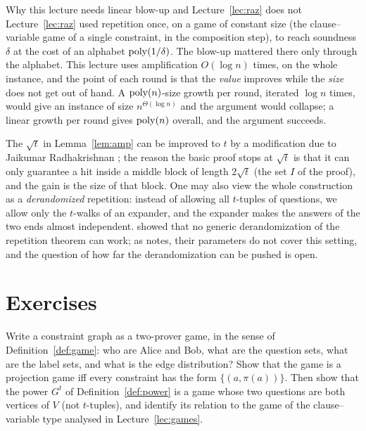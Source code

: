 \begin{bigpicture}{Why this lecture needs linear blow-up and Lecture~\ref{lec:raz} does not}
Lecture~\ref{lec:raz} used repetition once, on a game of constant size (the clause--variable game of a single constraint, in the composition step), to reach soundness $\delta$ at the cost of an alphabet $\operatorname{poly}(1/\delta)$.  The blow-up mattered there only through the alphabet.
This lecture uses amplification $O(\log n)$ times, on the whole instance, and the point of each round is that the \emph{value} improves while the \emph{size} does not get out of hand.
A $\operatorname{poly}(n)$-size growth per round, iterated $\log n$ times, would give an instance of size $n^{\Theta(\log n)}$ and the argument would collapse; a linear growth per round gives $\operatorname{poly}(n)$ overall, and the argument succeeds.
\end{bigpicture}

\begin{remark}
The $\sqrt t$ in Lemma~\ref{lem:amp} can be improved to $t$ by a modification due to Jaikumar Radhakrishnan \citep[footnote in Section~9]{Dinur07}; the reason the basic proof stops at $\sqrt t$ is that it can only guarantee a hit inside a middle block of length $2\sqrt t$ (the set $I$ of the proof), and the gain is the size of that block.
One may also view the whole construction as a \emph{derandomized} repetition: instead of allowing all $t$-tuples of questions, we allow only the $t$-walks of an expander, and the expander makes the answers of the two ends almost independent.
\citet{FeigeKilian95} showed that no generic derandomization of the repetition theorem can work; as \citet{Dinur07} notes, their parameters do not cover this setting, and the question of how far the derandomization can be pushed is open.
\end{remark}


\section*{Exercises}

\begin{exercise}[\stars{$\star$}]\label{ex:cg-game}
Write a constraint graph as a two-prover game, in the sense of Definition~\ref{def:game}: who are Alice and Bob, what are the question sets, what are the label sets, and what is the edge distribution?  Show that the game is a projection game iff every constraint has the form $\{(a,\pi(a))\}$.
Then show that the power $G^t$ of Definition~\ref{def:power} is a game whose two questions are both vertices of $V$ (not $t$-tuples), and identify its relation to the game of the clause--variable type analysed in Lecture~\ref{lec:games}.
\end{exercise}


